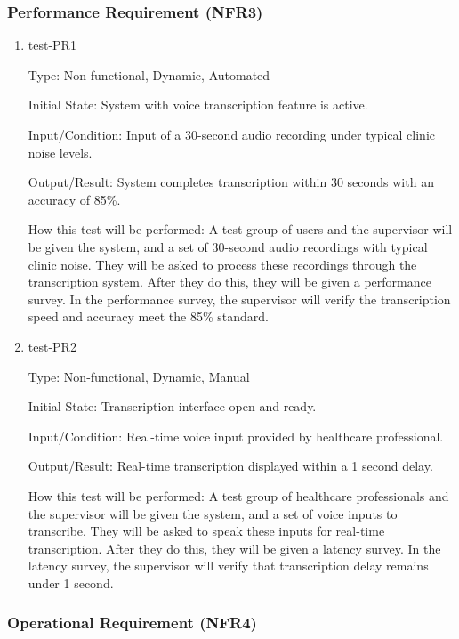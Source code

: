 \documentclass[12pt, titlepage]{article}
\begin{document}
\subsubsection{Performance Requirement (NFR3)} \label{section:4.2.3}

\begin{enumerate}
    \item{test-PR1} \label{test-PR1}
    
    Type: Non-functional, Dynamic, Automated
    
    Initial State: System with voice transcription feature is active.
    
    Input/Condition: Input of a 30-second audio recording under typical clinic noise levels.
    
    Output/Result: System completes transcription within 30 seconds with an accuracy of 85\%.
    
    How this test will be performed: A test group of users and the supervisor will be given the system, and a set of 30-second audio recordings with typical clinic noise. They will be asked to process these recordings through the transcription system. After they do this, they will be given a performance survey. In the performance survey, the supervisor will verify the transcription speed and accuracy meet the 85\% standard.

    \item{test-PR2} \label{test-PR2}
    
    Type: Non-functional, Dynamic, Manual
    
    Initial State: Transcription interface open and ready.
    
    Input/Condition: Real-time voice input provided by healthcare professional.
    
    Output/Result: Real-time transcription displayed within a 1 second delay.
    
    How this test will be performed: A test group of healthcare professionals and the supervisor will be given the system, and a set of voice inputs to transcribe. They will be asked to speak these inputs for real-time transcription. After they do this, they will be given a latency survey. In the latency survey, the supervisor will verify that transcription delay remains under 1 second.
\end{enumerate}

\subsubsection{Operational Requirement (NFR4)} \label{section:4.2.4}
\end{document}
